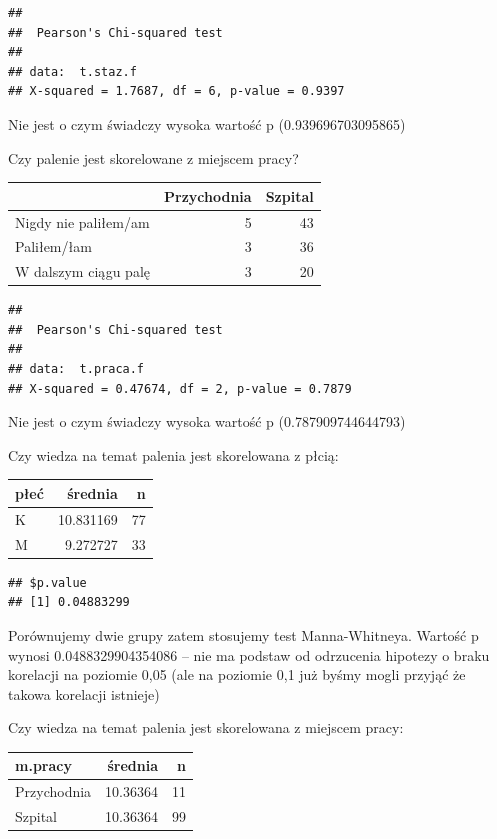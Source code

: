 \documentclass[
  openany]{book}
\begin{document}
\begin{verbatim}
## 
##  Pearson's Chi-squared test
## 
## data:  t.staz.f
## X-squared = 1.7687, df = 6, p-value = 0.9397
\end{verbatim}

Nie jest o czym świadczy wysoka wartość p (0.939696703095865)

Czy palenie jest skorelowane z miejscem pracy?

\begin{tabular}{l|r|r}
\hline
  & Przychodnia & Szpital\\
\hline
Nigdy nie paliłem/am & 5 & 43\\
\hline
Paliłem/łam & 3 & 36\\
\hline
W dalszym ciągu palę & 3 & 20\\
\hline
\end{tabular}

\begin{verbatim}
## 
##  Pearson's Chi-squared test
## 
## data:  t.praca.f
## X-squared = 0.47674, df = 2, p-value = 0.7879
\end{verbatim}

Nie jest o czym świadczy wysoka wartość p (0.787909744644793)

Czy wiedza na temat palenia jest skorelowana z płcią:

\begin{tabular}{l|r|r}
\hline
płeć & średnia & n\\
\hline
K & 10.831169 & 77\\
\hline
M & 9.272727 & 33\\
\hline
\end{tabular}

\begin{verbatim}
## $p.value
## [1] 0.04883299
\end{verbatim}

Porównujemy dwie grupy zatem stosujemy test Manna-Whitneya.
Wartość p wynosi 0.0488329904354086 -- nie ma podstaw
od odrzucenia hipotezy o braku korelacji na poziomie 0,05 (ale na poziomie
0,1 już byśmy mogli przyjąć że takowa korelacji istnieje)

Czy wiedza na temat palenia jest skorelowana z miejscem pracy:

\begin{tabular}{l|r|r}
\hline
m.pracy & średnia & n\\
\hline
Przychodnia & 10.36364 & 11\\
\hline
Szpital & 10.36364 & 99\\
\hline
\end{tabular}
\end{document}
